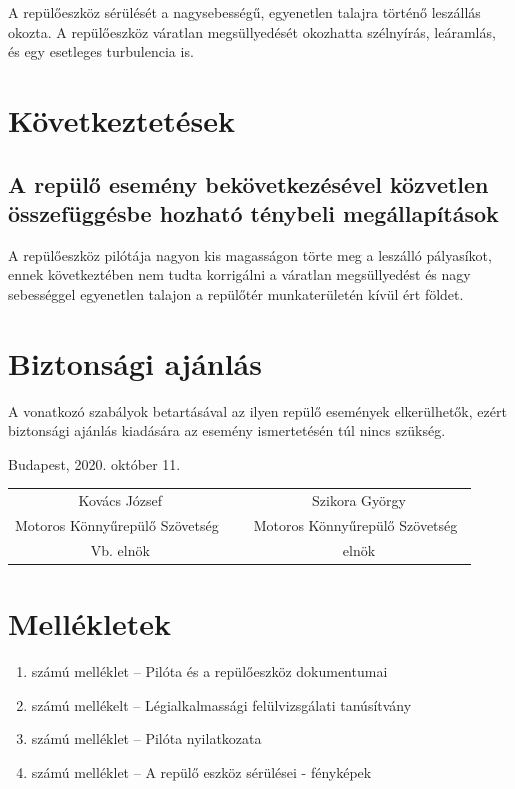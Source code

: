 \documentclass[a4paper,10pt]{article}
\newcommand{\mksz}{Motoros Könnyűrepülő Szövetség\ }
\begin{document}
A repülőeszköz sérülését a nagysebességű, egyenetlen talajra történő leszállás 
okozta. A repülőeszköz váratlan megsüllyedését okozhatta szélnyírás, leáramlás, 
és egy esetleges turbulencia is.

\section{Következtetések}
\subsection{A repülő esemény bekövetkezésével közvetlen összefüggésbe hozható 
ténybeli megállapítások}
A repülőeszköz pilótája nagyon kis magasságon törte meg a leszálló pályasíkot, 
ennek következtében nem tudta korrigálni a váratlan megsüllyedést és nagy 
sebességgel egyenetlen talajon a repülőtér munkaterületén kívül ért földet.

\section{Biztonsági ajánlás}
A vonatkozó szabályok betartásával az ilyen repülő események elkerülhetők, 
ezért biztonsági ajánlás kiadására az esemény ismertetésén túl nincs szükség.

\vspace{2cm}

Budapest, 2020. október 11.

\vspace{4cm}

\begin{tabular*}{16cm}{ccc}
 Kovács József&\hspace{3cm} &Szikora György\\
 \mksz&\hspace{3cm} &\mksz\\
 Vb. elnök&\hspace{3cm} &elnök\\
\end{tabular*}

\vspace{3cm}
\section*{Mellékletek}
\begin{enumerate}
 \item számú melléklet -- Pilóta és a repülőeszköz dokumentumai
 \item számú mellékelt -- Légialkalmassági felülvizsgálati tanúsítvány
 \item számú melléklet -- Pilóta nyilatkozata
 \item számú melléklet -- A repülő eszköz sérülései - fényképek
\end{enumerate}
\end{document}
